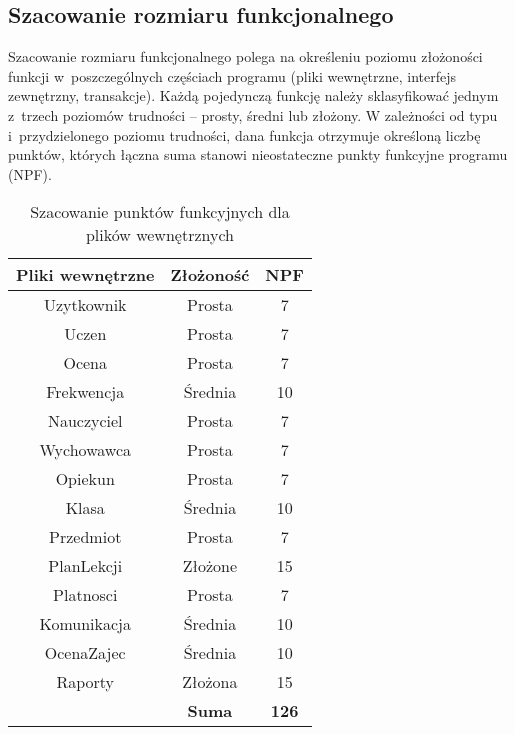 \documentclass[12pt,leqno,twoside]{mwart}
\begin{document}
\subsection{Szacowanie rozmiaru funkcjonalnego}
\noindent Szacowanie rozmiaru funkcjonalnego polega na określeniu poziomu złożoności funkcji w~poszczególnych częściach programu (pliki wewnętrzne, interfejs zewnętrzny, transakcje). Każdą pojedynczą funkcję należy sklasyfikować jednym z~trzech poziomów trudności -- prosty, średni lub złożony. W zależności od typu i~przydzielonego poziomu trudności, dana funkcja otrzymuje określoną liczbę punktów, których łączna suma stanowi nieostateczne punkty funkcyjne programu (NPF).
\begin{table}[h]
	\centering
	\caption{Szacowanie punktów funkcyjnych dla plików wewnętrznych}
		\rule{0pt}{3ex}
		\begin{tabular}{c|c|c|}
		\hline
		\multicolumn{1}{|c|}{\textbf{Pliki wewnętrzne}} & \textbf{Złożoność} & \textbf{NPF} \\ \hline
		\multicolumn{1}{|c|}{Uzytkownik} 	& Prosta 	& 7 \\ \hline
		\multicolumn{1}{|c|}{Uczen} 		& Prosta 	& 7 \\ \hline
		\multicolumn{1}{|c|}{Ocena} 		& Prosta 	& 7 \\ \hline
		\multicolumn{1}{|c|}{Frekwencja} 	& Średnia 	& 10 \\ \hline
		\multicolumn{1}{|c|}{Nauczyciel} 	& Prosta 	& 7 \\ \hline
		\multicolumn{1}{|c|}{Wychowawca} 	& Prosta 	& 7 \\ \hline
		\multicolumn{1}{|c|}{Opiekun} 		& Prosta 	& 7 \\ \hline
		\multicolumn{1}{|c|}{Klasa} 		& Średnia 	& 10 \\ \hline
		\multicolumn{1}{|c|}{Przedmiot} 	& Prosta 	& 7 \\ \hline
		\multicolumn{1}{|c|}{PlanLekcji} 	& Złożone 	& 15 \\ \hline
		\multicolumn{1}{|c|}{Platnosci} 	& Prosta 	& 7 \\ \hline
		\multicolumn{1}{|c|}{Komunikacja} & Średnia 	& 10 \\ \hline
		\multicolumn{1}{|c|}{OcenaZajec} 	& Średnia 	& 10 \\ \hline
		\multicolumn{1}{|c|}{Raporty} 	& Złożona 	& 15 \\ \hline
					& \textbf{Suma}	& \textbf{126} \\ \cline{2-3}
		\end{tabular}
	\label{pkt_fun_struktury}
\end{table}
\end{document}
